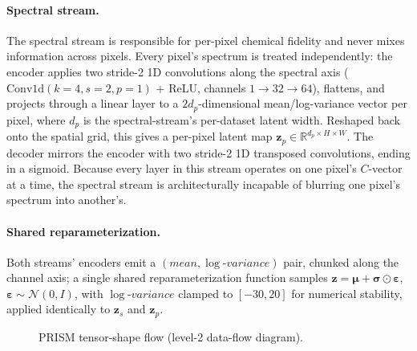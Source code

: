 \documentclass{article} %
\begin{document}
\paragraph{Spectral stream.} The spectral stream is responsible for per-pixel chemical fidelity and never mixes information across pixels. Every pixel's spectrum is treated independently: the encoder applies two stride-2 1D convolutions along the spectral axis ($\mathrm{Conv1d}(k{=}4,s{=}2,p{=}1)$ + ReLU, channels $1{\to}32{\to}64$), flattens, and projects through a linear layer to a $2d_p$-dimensional mean/log-variance vector per pixel, where $d_p$ is the spectral-stream's per-dataset latent width. Reshaped back onto the spatial grid, this gives a per-pixel latent map $\mathbf{z}_p \in \mathbb{R}^{d_p \times H \times W}$. The decoder mirrors the encoder with two stride-2 1D transposed convolutions, ending in a sigmoid. Because every layer in this stream operates on one pixel's $C$-vector at a time, the spectral stream is architecturally incapable of blurring one pixel's spectrum into another's.

\paragraph{Shared reparameterization.} Both streams' encoders emit a $(mean, \log\text{-}variance)$ pair, chunked along the channel axis; a single shared reparameterization function samples $\mathbf{z} = \boldsymbol{\mu} + \boldsymbol{\sigma} \odot \boldsymbol{\varepsilon}$, $\boldsymbol{\varepsilon} \sim \mathcal{N}(0, I)$, with $\log\text{-}variance$ clamped to $[-30, 20]$ for numerical stability, applied identically to $\mathbf{z}_s$ and $\mathbf{z}_p$.

\begin{figure}[t]
\centering
{}
\caption{PRISM tensor-shape flow (level-2 data-flow diagram).}
\label{fig:l2dfd}
\end{figure}
\end{document}
